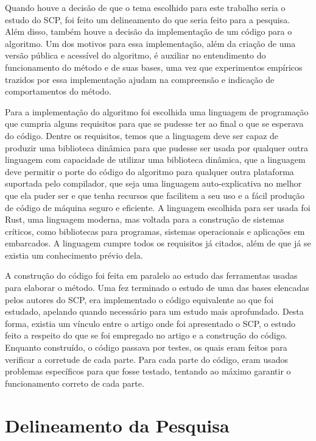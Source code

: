 Quando houve a decisão de que o tema escolhido para este trabalho seria o estudo do SCP, foi feito um delineamento do que seria feito para a pesquisa. Além disso, também houve a decisão da implementação de um código para o algoritmo. Um dos motivos para essa implementação, além da criação de uma versão pública e acessível do algoritmo, é auxiliar no entendimento do funcionamento do método e de suas bases, uma vez que experimentos empíricos trazidos por essa implementação ajudam na compreensão e indicação de comportamentos do método.

Para a implementação do algoritmo foi escolhida uma linguagem de programação que cumpria alguns requisitos para que se pudesse ter ao final o que se esperava do código. Dentre os requisitos, temos que a linguagem deve ser capaz de produzir uma biblioteca dinâmica para que pudesse ser usada por qualquer outra linguagem com capacidade de utilizar uma biblioteca dinâmica, que a linguagem deve permitir o porte do código do algoritmo para qualquer outra plataforma suportada pelo compilador, que seja uma linguagem auto-explicativa no melhor que ela puder ser e que tenha recursos que facilitem a seu uso e a fácil produção de código de máquina seguro e eficiente. A linguagem escolhida para ser usada foi Rust, uma linguagem moderna, mas voltada para a construção de sistemas críticos, como bibliotecas para programas, sistemas operacionais e aplicações em embarcados. A linguagem cumpre todos os requisitos já citados, além de que já se existia um conhecimento prévio dela.

A construção do código foi feita em paralelo ao estudo das ferramentas usadas para elaborar o método. Uma fez terminado o estudo de uma das bases elencadas pelos autores do SCP, era implementado o código equivalente ao que foi estudado, apelando quando necessário para um estudo mais aprofundado. Desta forma, existia um vínculo entre o artigo onde foi apresentado o SCP, o estudo feito a respeito do que se foi empregado no artigo e a construção do código. Enquanto construído, o código passava por testes, os quais eram feitos para verificar a corretude de cada parte. Para cada parte do código, eram usados problemas específicos para que fosse testado, tentando ao máximo garantir o funcionamento correto de cada parte.

\section{Delineamento da Pesquisa}
\label{sec:titSecDelPesq}

